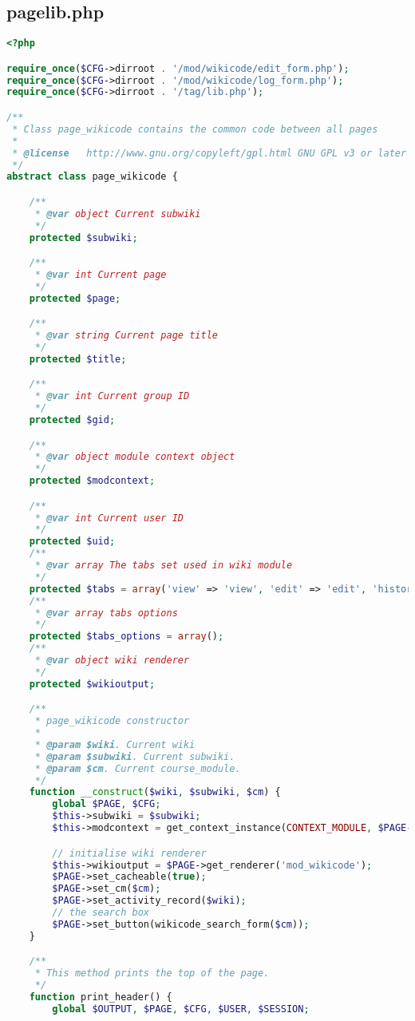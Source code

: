 \subsection{pagelib.php}
\begin{lstlisting}[language=PHP]
<?php

require_once($CFG->dirroot . '/mod/wikicode/edit_form.php');
require_once($CFG->dirroot . '/mod/wikicode/log_form.php');
require_once($CFG->dirroot . '/tag/lib.php');

/**
 * Class page_wikicode contains the common code between all pages
 *
 * @license   http://www.gnu.org/copyleft/gpl.html GNU GPL v3 or later
 */
abstract class page_wikicode {

    /**
     * @var object Current subwiki
     */
    protected $subwiki;

    /**
     * @var int Current page
     */
    protected $page;

    /**
     * @var string Current page title
     */
    protected $title;

    /**
     * @var int Current group ID
     */
    protected $gid;

    /**
     * @var object module context object
     */
    protected $modcontext;

    /**
     * @var int Current user ID
     */
    protected $uid;
    /**
     * @var array The tabs set used in wiki module
     */
    protected $tabs = array('view' => 'view', 'edit' => 'edit', 'history' => 'history', 'log' => 'log', 'admin' => 'admin');
    /**
     * @var array tabs options
     */
    protected $tabs_options = array();
    /**
     * @var object wiki renderer
     */
    protected $wikioutput;

    /**
     * page_wikicode constructor
     *
     * @param $wiki. Current wiki
     * @param $subwiki. Current subwiki.
     * @param $cm. Current course_module.
     */
    function __construct($wiki, $subwiki, $cm) {
        global $PAGE, $CFG;
        $this->subwiki = $subwiki;
        $this->modcontext = get_context_instance(CONTEXT_MODULE, $PAGE->cm->id);

        // initialise wiki renderer
        $this->wikioutput = $PAGE->get_renderer('mod_wikicode');
        $PAGE->set_cacheable(true);
        $PAGE->set_cm($cm);
        $PAGE->set_activity_record($wiki);
        // the search box
        $PAGE->set_button(wikicode_search_form($cm));
    }

    /**
     * This method prints the top of the page.
     */
    function print_header() {
        global $OUTPUT, $PAGE, $CFG, $USER, $SESSION;


\end{lstlisting}
